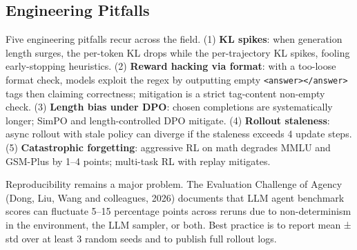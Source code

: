\subsection{Engineering Pitfalls}\label{engineering-pitfalls}

Five engineering pitfalls recur across the field. (1) \textbf{KL spikes}: when generation length surges, the per-token KL drops while the per-trajectory KL spikes, fooling early-stopping heuristics. (2) \textbf{Reward hacking via format}: with a too-loose format check, models exploit the regex by outputting empty \texttt{\textless{}answer\textgreater{}\textless{}/answer\textgreater{}} tags then claiming correctness; mitigation is a strict tag-content non-empty check. (3) \textbf{Length bias under DPO}: chosen completions are systematically longer; SimPO and length-controlled DPO mitigate. (4) \textbf{Rollout staleness}: async rollout with stale policy can diverge if the staleness exceeds 4 update steps. (5) \textbf{Catastrophic forgetting}: aggressive RL on math degrades MMLU and GSM-Plus by 1--4 points; multi-task RL with replay mitigates.

Reproducibility remains a major problem. The Evaluation Challenge of Agency (Dong, Liu, Wang and colleagues, 2026) documents that LLM agent benchmark scores can fluctuate 5--15 percentage points across reruns due to non-determinism in the environment, the LLM sampler, or both. Best practice is to report mean ± std over at least 3 random seeds and to publish full rollout logs.


